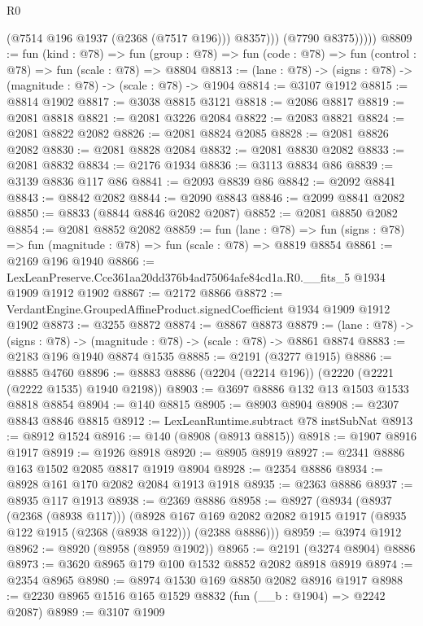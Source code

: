 \begin{lexlean}{R0}
\begin{coremodule}
                  (@7514 @196 @1937 (@2368 (@7517 @196)))
                  @8357)))
            (@7790 @8375)))))
@8809 := fun (kind : @78) =>
  fun (group : @78) => fun (code : @78) => fun (control : @78) => fun (scale : @78) => @8804
@8813 := (lane : @78) -> (signs : @78) -> (magnitude : @78) -> (scale : @78) -> @1904
@8814 := @3107 @1912
@8815 := @8814 @1902
@8817 := @3038 @8815 @3121
@8818 := @2086 @8817
@8819 := @2081 @8818
@8821 := @2081 @3226 @2084
@8822 := @2083 @8821
@8824 := @2081 @8822 @2082
@8826 := @2081 @8824 @2085
@8828 := @2081 @8826 @2082
@8830 := @2081 @8828 @2084
@8832 := @2081 @8830 @2082
@8833 := @2081 @8832
@8834 := @2176 @1934
@8836 := @3113 @8834 @86
@8839 := @3139 @8836 @117 @86
@8841 := @2093 @8839 @86
@8842 := @2092 @8841
@8843 := @8842 @2082
@8844 := @2090 @8843
@8846 := @2099 @8841 @2082
@8850 := @8833 (@8844 @8846 @2082 @2087)
@8852 := @2081 @8850 @2082
@8854 := @2081 @8852 @2082
@8859 := fun (lane : @78) =>
  fun (signs : @78) => fun (magnitude : @78) => fun (scale : @78) => @8819 @8854
@8861 := @2169 @196 @1940
@8866 := LexLeanPreserve.Cce361aa20dd376b4ad75064afe84cd1a.R0.__fits_5 @1934 @1909 @1912 @1902
@8867 := @2172 @8866
@8872 := VerdantEngine.GroupedAffineProduct.signedCoefficient @1934 @1909 @1912 @1902
@8873 := @3255 @8872
@8874 := @8867 @8873
@8879 := (lane : @78) -> (signs : @78) -> (magnitude : @78) -> (scale : @78) -> @8861 @8874
@8883 := @2183 @196 @1940 @8874 @1535
@8885 := @2191 (@3277 @1915)
@8886 := @8885 @4760
@8896 := @8883 @8886 (@2204 (@2214 @196)) (@2220 (@2221 (@2222 @1535) @1940 @2198))
@8903 := @3697 @8886 @132 @13 @1503 @1533 @8818 @8854
@8904 := @140 @8815
@8905 := @8903 @8904
@8908 := @2307 @8843 @8846 @8815
@8912 := LexLeanRuntime.subtract @78 instSubNat
@8913 := @8912 @1524
@8916 := @140 (@8908 (@8913 @8815))
@8918 := @1907 @8916 @1917
@8919 := @1926 @8918
@8920 := @8905 @8919
@8927 := @2341 @8886 @163 @1502 @2085 @8817 @1919 @8904
@8928 := @2354 @8886
@8934 := @8928 @161 @170 @2082 @2084 @1913 @1918
@8935 := @2363 @8886
@8937 := @8935 @117 @1913
@8938 := @2369 @8886
@8958 := @8927
    (@8934
      (@8937 (@2368 (@8938 @117)))
      (@8928
        @167
        @169
        @2082
        @2082
        @1915
        @1917
        (@8935 @122 @1915 (@2368 (@8938 @122)))
        (@2388 @8886)))
@8959 := @3974 @1912
@8962 := @8920 (@8958 (@8959 @1902))
@8965 := @2191 (@3274 @8904) @8886
@8973 := @3620 @8965 @179 @100 @1532 @8852 @2082 @8918 @8919
@8974 := @2354 @8965
@8980 := @8974 @1530 @169 @8850 @2082 @8916 @1917
@8988 := @2230 @8965 @1516 @165 @1529 @8832 (fun (__b : @1904) => @2242 @2087)
@8989 := @3107 @1909

\end{coremodule}
\end{lexlean}
